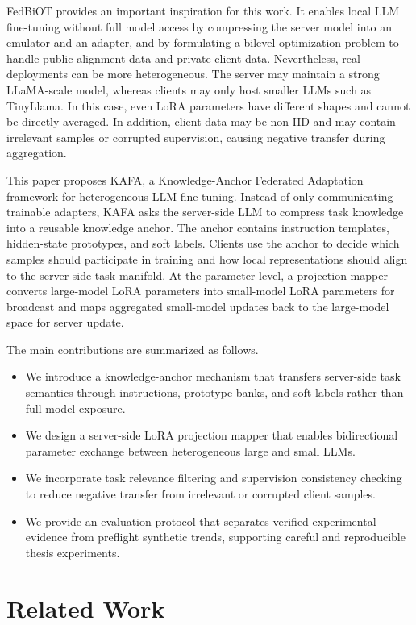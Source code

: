\documentclass[conference]{IEEEtran}
\begin{document}
FedBiOT \cite{fedbiot} provides an important inspiration for this work. It enables local LLM fine-tuning without full model access by compressing the server model into an emulator and an adapter, and by formulating a bilevel optimization problem to handle public alignment data and private client data. Nevertheless, real deployments can be more heterogeneous. The server may maintain a strong LLaMA-scale model, whereas clients may only host smaller LLMs such as TinyLlama. In this case, even LoRA parameters have different shapes and cannot be directly averaged. In addition, client data may be non-IID and may contain irrelevant samples or corrupted supervision, causing negative transfer during aggregation.

This paper proposes KAFA, a Knowledge-Anchor Federated Adaptation framework for heterogeneous LLM fine-tuning. Instead of only communicating trainable adapters, KAFA asks the server-side LLM to compress task knowledge into a reusable knowledge anchor. The anchor contains instruction templates, hidden-state prototypes, and soft labels. Clients use the anchor to decide which samples should participate in training and how local representations should align to the server-side task manifold. At the parameter level, a projection mapper converts large-model LoRA parameters into small-model LoRA parameters for broadcast and maps aggregated small-model updates back to the large-model space for server update.

The main contributions are summarized as follows.
\begin{itemize}
\item We introduce a knowledge-anchor mechanism that transfers server-side task semantics through instructions, prototype banks, and soft labels rather than full-model exposure.
\item We design a server-side LoRA projection mapper that enables bidirectional parameter exchange between heterogeneous large and small LLMs.
\item We incorporate task relevance filtering and supervision consistency checking to reduce negative transfer from irrelevant or corrupted client samples.
\item We provide an evaluation protocol that separates verified experimental evidence from preflight synthetic trends, supporting careful and reproducible thesis experiments.
\end{itemize}

\section{Related Work}
\end{document}
